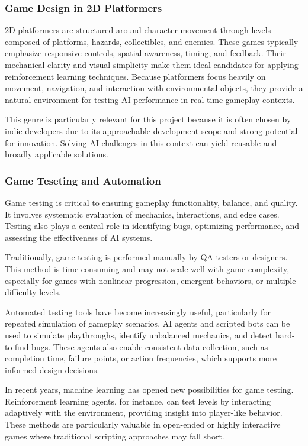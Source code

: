 \documentclass[12pt,oneside,openright,a4paper]{cpe-english-project}
\begin{document}
\subsubsection{Game Design in 2D Platformers}
2D platformers are structured around character movement through levels composed of platforms, hazards, collectibles, and enemies. These games typically emphasize responsive controls, spatial awareness, timing, and feedback. Their mechanical clarity and visual simplicity make them ideal candidates for applying reinforcement learning techniques. Because platformers focus heavily on movement, navigation, and interaction with environmental objects, they provide a natural environment for testing AI performance in real-time gameplay contexts.\par
This genre is particularly relevant for this project because it is often chosen by indie developers due to its approachable development scope and strong potential for innovation. Solving AI challenges in this context can yield reusable and broadly applicable solutions.\par
\subsubsection{Game Teseting and Automation}
Game testing is critical to ensuring gameplay functionality, balance, and quality. It involves systematic evaluation of mechanics, interactions, and edge cases. Testing also plays a central role in identifying bugs, optimizing performance, and assessing the effectiveness of AI systems.\par
Traditionally, game testing is performed manually by QA testers or designers. This method is time-consuming and may not scale well with game complexity, especially for games with nonlinear progression, emergent behaviors, or multiple difficulty levels.\par
Automated testing tools have become increasingly useful, particularly for repeated simulation of gameplay scenarios. AI agents and scripted bots can be used to simulate playthroughs, identify unbalanced mechanics, and detect hard-to-find bugs. These agents also enable consistent data collection, such as completion time, failure points, or action frequencies, which supports more informed design decisions.\par
In recent years, machine learning has opened new possibilities for game testing. Reinforcement learning agents, for instance, can test levels by interacting adaptively with the environment, providing insight into player-like behavior. These methods are particularly valuable in open-ended or highly interactive games where traditional scripting approaches may fall short.\par
\end{document}
